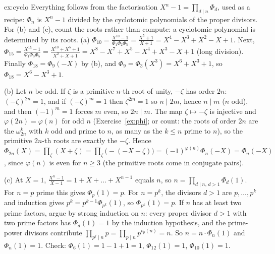 \begin{solution}{ex:cyclo}
\idea Everything follows from the factorisation $X^n-1=\prod_{d\mid n}\Phi_d$, used as a recipe: $\Phi_n$ is $X^n-1$ divided by the cyclotomic polynomials of the proper divisors. For (b) and (c), count the roots rather than compute: a cyclotomic polynomial is determined by its roots.
\writeup (a) $\Phi_{10}=\frac{X^{10}-1}{\Phi_1\Phi_2\Phi_5}=\frac{X^5+1}{X+1}=X^4-X^3+X^2-X+1$. Next, $\Phi_{15}=\frac{X^{15}-1}{\Phi_1\Phi_3\Phi_5}=\frac{X^{10}+X^5+1}{X^2+X+1}=X^8-X^7+X^5-X^4+X^3-X+1$ (long division). Finally $\Phi_{18}=\Phi_9(-X)$ by (b), and $\Phi_9=\Phi_3(X^3)=X^6+X^3+1$, so $\Phi_{18}=X^6-X^3+1$.

(b) Let $n$ be odd. If $\zeta$ is a primitive $n$-th root of unity, $-\zeta$ has order $2n$: $(-\zeta)^{2n}=1$, and if $(-\zeta)^m=1$ then $\zeta^{2m}=1$ so $n\mid2m$, hence $n\mid m$ ($n$ odd), and then $(-1)^m=1$ forces $m$ even, so $2n\mid m$. The map $\zeta\mapsto-\zeta$ is injective and $\varphi(2n)=\varphi(n)$ for odd $n$ (Exercise~\ref{ex:phi}; or count: the roots of order $2n$ are the $\omega_{2n}^k$ with $k$ odd and prime to $n$, as many as the $k\le n$ prime to $n$), so the primitive $2n$-th roots are exactly the $-\zeta$. Hence $\Phi_{2n}(X)=\prod_\zeta(X+\zeta)=\prod_\zeta\bigl(-(-X-\zeta)\bigr)=(-1)^{\varphi(n)}\Phi_n(-X)=\Phi_n(-X)$, since $\varphi(n)$ is even for $n\ge3$ (the primitive roots come in conjugate pairs).

(c) At $X=1$, $\frac{X^n-1}{X-1}=1+X+\dots+X^{n-1}$ equals $n$, so $n=\prod_{d\mid n,\,d>1}\Phi_d(1)$. For $n=p$ prime this gives $\Phi_p(1)=p$. For $n=p^k$, the divisors $d>1$ are $p,\dots,p^k$ and induction gives $p^k=p^{k-1}\Phi_{p^k}(1)$, so $\Phi_{p^k}(1)=p$. If $n$ has at least two prime factors, argue by strong induction on $n$: every proper divisor $d>1$ with two prime factors has $\Phi_d(1)=1$ by the induction hypothesis, and the prime-power divisors contribute $\prod_{p^j\mid n}p=\prod_{p\mid n}p^{v_p(n)}=n$. So $n=n\cdot\Phi_n(1)$ and $\Phi_n(1)=1$. Check: $\Phi_6(1)=1-1+1=1$, $\Phi_{12}(1)=1$, $\Phi_{10}(1)=1$.
\end{solution}

